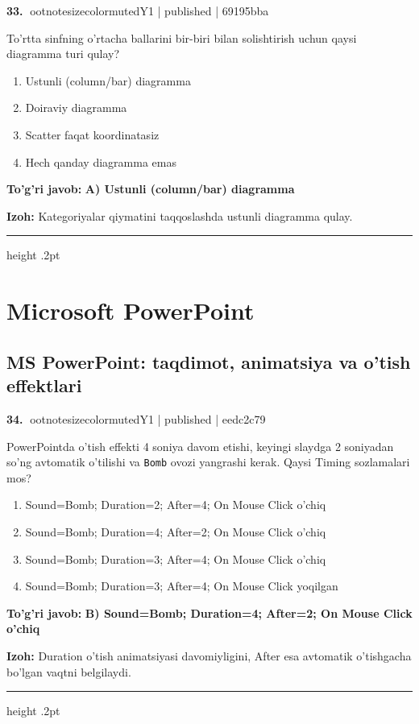 \documentclass[10pt,a4paper]{article}
\begin{document}
\textbf{\color{ink}33.} {ootnotesizecolor{muted}Y1 | published | 69195bba}
\par
To'rtta sinfning o'rtacha ballarini bir-biri bilan solishtirish uchun qaysi diagramma turi qulay?
\begin{enumerate}[label=\Alph*),leftmargin=9mm]
\item Ustunli (column/bar) diagramma
\item Doiraviy diagramma
\item Scatter faqat koordinatasiz
\item Hech qanday diagramma emas
\end{enumerate}
\begin{tcolorbox}[enhanced,breakable,colback=teal!4,colframe=teal!55!black,boxrule=0.45pt,arc=1.2mm,left=2.8mm,right=2.8mm,top=2mm,bottom=2mm]
\textbf{\color{teal}To'g'ri javob:} \textbf{A) Ustunli (column/bar) diagramma}
\par\smallskip
\textbf{Izoh:} Kategoriyalar qiymatini taqqoslashda ustunli diagramma qulay.
\end{tcolorbox}
\vspace{2mm}\hrule height .2pt\vspace{2mm}
\section{Microsoft PowerPoint}
\subsection{MS PowerPoint: taqdimot, animatsiya va o'tish effektlari}

\textbf{\color{ink}34.} {ootnotesizecolor{muted}Y1 | published | eedc2c79}
\par
PowerPointda o'tish effekti 4 soniya davom etishi, keyingi slaydga 2 soniyadan so'ng avtomatik o'tilishi va \texttt{Bomb} ovozi yangrashi kerak. Qaysi Timing sozlamalari mos?
\begin{enumerate}[label=\Alph*),leftmargin=9mm]
\item Sound=Bomb; Duration=2; After=4; On Mouse Click o'chiq
\item Sound=Bomb; Duration=4; After=2; On Mouse Click o'chiq
\item Sound=Bomb; Duration=3; After=4; On Mouse Click o'chiq
\item Sound=Bomb; Duration=3; After=4; On Mouse Click yoqilgan
\end{enumerate}
\begin{tcolorbox}[enhanced,breakable,colback=teal!4,colframe=teal!55!black,boxrule=0.45pt,arc=1.2mm,left=2.8mm,right=2.8mm,top=2mm,bottom=2mm]
\textbf{\color{teal}To'g'ri javob:} \textbf{B) Sound=Bomb; Duration=4; After=2; On Mouse Click o'chiq}
\par\smallskip
\textbf{Izoh:} Duration o'tish animatsiyasi davomiyligini, After esa avtomatik o'tishgacha bo'lgan vaqtni belgilaydi.
\end{tcolorbox}
\vspace{2mm}\hrule height .2pt\vspace{2mm}
\end{document}
